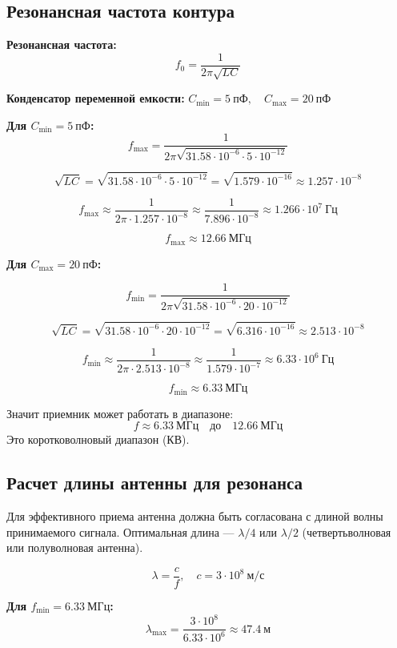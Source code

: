 \documentclass[a4paper]{article}
\begin{document}
\subsection{Резонансная частота контура}

\textbf{Резонансная частота:}
\[
f_0 = \frac{1}{2\pi \sqrt{LC}}
\]

\textbf{Конденсатор переменной емкости:} $C_{\min} = 5~\text{пФ},\quad C_{\max} = 20~\text{пФ}$

\textbf{Для $C_{\min} = 5~\text{пФ}$:}
\[
f_{\max} = \frac{1}{2\pi \sqrt{31.58 \cdot 10^{-6} \cdot 5 \cdot 10^{-12}}}
\]

\[
\sqrt{LC} = \sqrt{31.58 \cdot 10^{-6} \cdot 5 \cdot 10^{-12}} = \sqrt{1.579 \cdot 10^{-16}} \approx 1.257 \cdot 10^{-8}
\]

\[
f_{\max} \approx \frac{1}{2\pi \cdot 1.257 \cdot 10^{-8}} \approx \frac{1}{7.896 \cdot 10^{-8}} \approx 1.266 \cdot 10^{7}~\text{Гц}
\]

\[
f_{\max} \approx 12.66~\text{МГц}
\]

\textbf{Для $C_{\max} = 20~\text{пФ}$:}

\[
f_{\min} = \frac{1}{2\pi \sqrt{31.58 \cdot 10^{-6} \cdot 20 \cdot 10^{-12}}}
\]

\[
\sqrt{LC} = \sqrt{31.58 \cdot 10^{-6} \cdot 20 \cdot 10^{-12}} = \sqrt{6.316 \cdot 10^{-16}} \approx 2.513 \cdot 10^{-8}
\]

\[
f_{\min} \approx \frac{1}{2\pi \cdot 2.513 \cdot 10^{-8}} \approx \frac{1}{1.579 \cdot 10^{-7}} \approx 6.33 \cdot 10^{6}~\text{Гц}
\]

\[
f_{\min} \approx 6.33~\text{МГц}
\]


Значит приемник может работать в диапазоне:
\[
f \approx 6.33~\text{МГц} \quad \text{до} \quad 12.66~\text{МГц}
\]
Это коротковолновый диапазон (КВ).

\newpage

\subsection{Расчет длины антенны для резонанса}

Для эффективного приема антенна должна быть согласована с длиной волны принимаемого сигнала. Оптимальная длина — $\lambda/4$ или $\lambda/2$ (четвертьволновая или полуволновая антенна).

\[
\lambda = \frac{c}{f}, \quad c = 3 \cdot 10^{8}~\text{м/с}
\]

\textbf{Для $f_{\min} = 6.33~\text{МГц}$:}
\[
\lambda_{\max} = \frac{3 \cdot 10^{8}}{6.33 \cdot 10^{6}} \approx 47.4~\text{м}
\]
\end{document}
